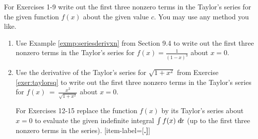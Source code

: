 \divider
\vspace{2mm}
\startexercises\label{sec9dot5}
{\small
{}
\par\noindent For Exercises 1-9 write out the first three nonzero terms in the
Taylor's series for the given function $f(x)$ about the given value $c$. You may
use any method you like.
\begin{enumerate}[item-label={\bfseries \arabic*.}]
 \item Use Example \ref{exmp:seriesderivxn} from Section 9.4 to write out the
  first three nonzero terms in the Taylor's series for
  $f(x) = \frac{1}{(1 - x)^3}$ about $x=0$.
 \item Use the derivative of the Taylor's series for $\sqrt{1 + x^2}$ from
  Exercise \ref{exer:taylorsq} to write out the first three nonzero terms in the
  Taylor's series for $f(x) ~=~ \frac{x^2}{\sqrt{1 + x^2}}$ about $x=0$.
\par\noindent For Exercises 12-15 replace the function $f(x)$ by its Taylor's
 series about $x=0$ to evaluate the given indefinite integral $\int f(x) \;d\!x$
 (up to the first three nonzero terms in the series).
[item-label={{[\bfseries \arabic*.]}}]
\end{enumerate}}
